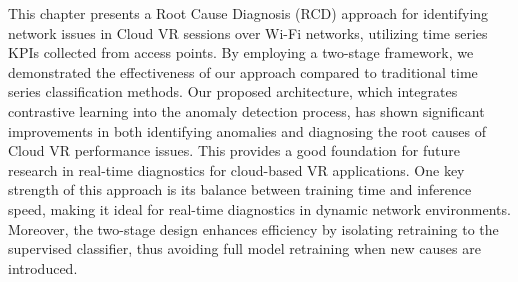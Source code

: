 This chapter presents a Root Cause Diagnosis (RCD) approach for identifying network issues in Cloud VR sessions over Wi-Fi networks, utilizing time series KPIs collected from access points. By employing a two-stage framework, we demonstrated the effectiveness of our approach compared to traditional time series classification methods. Our proposed architecture, which integrates contrastive learning into the anomaly detection process, has shown significant improvements in both identifying anomalies and diagnosing the root causes of Cloud VR performance issues. This provides a good foundation for future research in real-time diagnostics for cloud-based VR applications. One key strength of this approach is its balance between training time and inference speed, making it ideal for real-time diagnostics in dynamic network environments. Moreover, the two-stage design enhances efficiency by isolating retraining to the supervised classifier, thus avoiding full model retraining when new causes are introduced.


